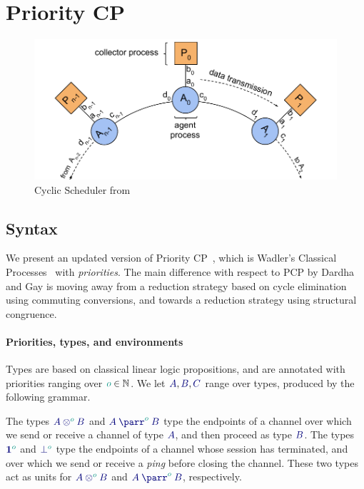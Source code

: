 \documentclass[main.tex]{subfiles}
\begin{document}
\section{Priority CP}

\begin{figure}[t]
  \centering
  \includegraphics[width=0.8\columnwidth]{scheduler}
  \vspace{-4mm}
  \caption{Cyclic Scheduler from \cite{dardha2018}}
  \label{fig:scheduler}
  \vspace{-4mm}
  \end{figure}

\subsection{Syntax}

We present an updated version of Priority CP~\cite[PCP]{dardha2018}, which is Wadler's Classical Processes~\cite[CP]{wadler2012} with \emph{priorities}.
The main difference with respect to PCP by Dardha and Gay \cite{dardha2018} is moving away from a reduction strategy based on cycle elimination using commuting conversions, and towards a reduction strategy using structural congruence.

\paragraph*{Priorities, types, and environments}
Types are based on classical linear logic propositions, and are annotated with priorities ranging over $\cs{o}\in\mathbb{N}$. We let $\ty{A}, \ty{B}, \ty{C}$ range over types, produced by the following grammar.

The types $\ty{\tytens[\cs{o}]{A}{B}}$ and $\ty{\typarr[\cs{o}]{A}{B}}$ type the endpoints of a channel over which we send or receive a channel of type $\ty{A}$, and then proceed as type $\ty{B}$.
The types $\ty{\tyone[\cs{o}]}$ and $\ty{\tybot[\cs{o}]}$ type the endpoints of a channel whose session has terminated, and over which we send or receive a \emph{ping} before closing the channel. These two types act as units for $\ty{\tytens[\cs{o}]{A}{B}}$ and $\ty{\typarr[\cs{o}]{A}{B}}$, respectively.
\end{document}
